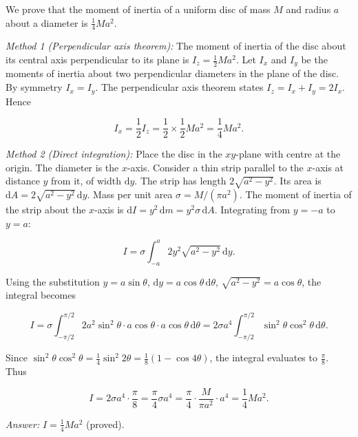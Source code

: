 \documentclass[11pt]{article}
\begin{document}
\begin{corrige}
We prove that the moment of inertia of a uniform disc of mass \(M\) and radius \(a\) about a diameter is \(\frac{1}{4}Ma^2\).

\emph{Method 1 (Perpendicular axis theorem):}
The moment of inertia of the disc about its central axis perpendicular to its plane is \(I_z = \frac{1}{2}Ma^2\). Let \(I_x\) and \(I_y\) be the moments of inertia about two perpendicular diameters in the plane of the disc. By symmetry \(I_x = I_y\). The perpendicular axis theorem states \(I_z = I_x + I_y = 2I_x\). Hence

\[
I_x = \frac{1}{2} I_z = \frac{1}{2} \times \frac{1}{2}Ma^2 = \frac{1}{4}Ma^2.
\]

\emph{Method 2 (Direct integration):}
Place the disc in the \(xy\)-plane with centre at the origin. The diameter is the \(x\)-axis. Consider a thin strip parallel to the \(x\)-axis at distance \(y\) from it, of width \(\mathrm{d}y\). The strip has length \(2\sqrt{a^2-y^2}\). Its area is \(\mathrm{d}A = 2\sqrt{a^2-y^2}\,\mathrm{d}y\). Mass per unit area \(\sigma = M/(\pi a^2)\). The moment of inertia of the strip about the \(x\)-axis is \(\mathrm{d}I = y^2\,\mathrm{d}m = y^2 \sigma\,\mathrm{d}A\). Integrating from \(y=-a\) to \(y=a\):

\[
I = \sigma \int_{-a}^{a} 2y^2\sqrt{a^2-y^2}\,\mathrm{d}y.
\]

Using the substitution \(y = a\sin\theta\), \(\mathrm{d}y = a\cos\theta\,\mathrm{d}\theta\), \(\sqrt{a^2-y^2} = a\cos\theta\), the integral becomes

\[
I = \sigma \int_{-\pi/2}^{\pi/2} 2a^2\sin^2\theta \cdot a\cos\theta \cdot a\cos\theta\,\mathrm{d}\theta = 2\sigma a^4 \int_{-\pi/2}^{\pi/2} \sin^2\theta\cos^2\theta\,\mathrm{d}\theta.
\]

Since \(\sin^2\theta\cos^2\theta = \frac{1}{4}\sin^2 2\theta = \frac{1}{8}(1-\cos 4\theta)\), the integral evaluates to \(\frac{\pi}{8}\). Thus

\[
I = 2\sigma a^4 \cdot \frac{\pi}{8} = \frac{\pi}{4}\sigma a^4 = \frac{\pi}{4} \cdot \frac{M}{\pi a^2} \cdot a^4 = \frac{1}{4}Ma^2.
\]

\emph{Answer:} \(I = \frac{1}{4}Ma^2\) (proved).
\end{corrige}
\end{document}
